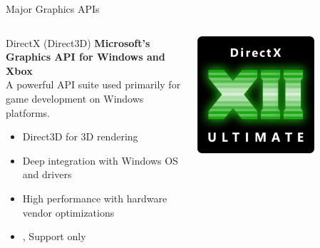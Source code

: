 \begin{frame}{Major Graphics APIs}
  \small
  \begin{columns}
    \begin{column}{0.7\textwidth}
      \begin{conceptbox}{DirectX (Direct3D)}
        \textbf{Microsoft's Graphics API for Windows and Xbox} \\
        A powerful API suite used primarily for game development on Windows platforms.
        \begin{itemize}
          \item Direct3D for 3D rendering
          \item Deep integration with Windows OS and drivers
          \item High performance with hardware vendor optimizations
          \item {},  Support only
        \end{itemize}
      \end{conceptbox}
    \end{column}
    \begin{column}{0.3\textwidth}
      \begin{center}
        \includegraphics[width=0.7\textwidth]{images/DirectX_12_Ultimate.png}
      \end{center}
    \end{column}
  \end{columns}
\end{frame}

